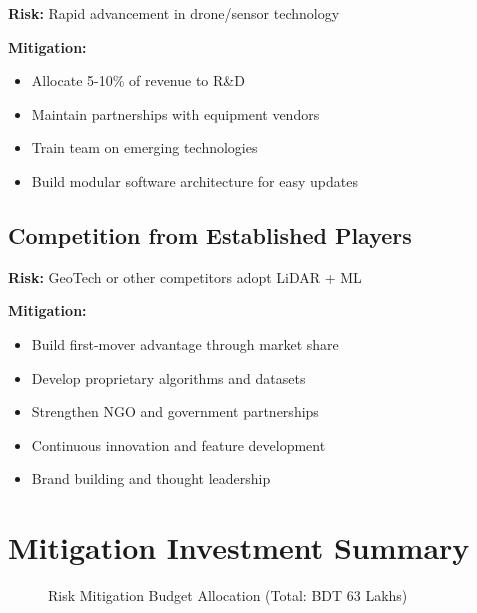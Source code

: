 \textbf{Risk:} Rapid advancement in drone/sensor technology

\textbf{Mitigation:}
\begin{itemize}
    \item Allocate 5-10\% of revenue to R\&D
    \item Maintain partnerships with equipment vendors
    \item Train team on emerging technologies
    \item Build modular software architecture for easy updates
\end{itemize}

\subsection{Competition from Established Players}

\textbf{Risk:} GeoTech or other competitors adopt LiDAR + ML

\textbf{Mitigation:}
\begin{itemize}
    \item Build first-mover advantage through market share
    \item Develop proprietary algorithms and datasets
    \item Strengthen NGO and government partnerships
    \item Continuous innovation and feature development
    \item Brand building and thought leadership
\end{itemize}

\section{Mitigation Investment Summary}

\begin{figure}[H]
    \centering
    \caption{Risk Mitigation Budget Allocation (Total: BDT 63 Lakhs)}
    \label{tab:risk_budget}
\end{figure}

